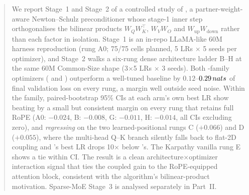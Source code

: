 \begin{abstract}
\noindent
We report Stage~1 and Stage~2 of a controlled study of \optCoupled, a partner-weight-aware Newton--Schulz preconditioner whose stage-1 inner step orthogonalises the bilinear products $W_Q W_K^{\top}$, $W_V W_O$ and $W_{\text{up}} W_{\text{down}}$ rather than each factor in isolation. Stage~1 is an in-repo LLaMA-like 60M harness reproduction (rung A0; 75/75 cells planned, 5 LRs $\times$ 5 seeds per optimizer), and Stage~2 walks a six-rung dense architecture ladder B--H at the same 60M Common-Size shape (3$\times$5 LRs $\times$ 3 seeds). Both \optMuon-family optimizers (\optMuon{} and \optCoupled) outperform a well-tuned \optAdamW{} baseline by $0.12$--$0.29\nats{}$ of final validation loss on every rung, a margin well outside seed noise. Within the \optMuon{} family, paired-bootstrap 95\% CIs at each arm's own best LR show \optCoupled{} beating \optMuon{} by a small but consistent margin on every rung that retains full RoPE (A0: $-0.024$\nats, B: $-0.008$\nats, G: $-0.011$\nats, H: $-0.014$\nats, all CIs excluding zero), and \emph{regressing} on the two learned-positional rungs C ($+0.066$\nats) and D ($+0.055$\nats), where the multi-head Q--K branch silently falls back to flat-2D coupling and \optCoupled{}'s best LR drops 10$\times$ below \optMuon{}'s. The Karpathy vanilla rung E shows a tie within CI. The result is a clean architecture$\times$optimizer interaction signal that ties the coupled gain to the RoPE-equipped attention block, consistent with the algorithm's bilinear-product motivation. Sparse-MoE Stage~3 is analysed separately in Part~II.
\end{abstract}
